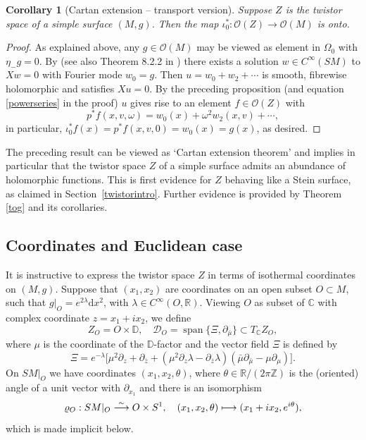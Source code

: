 \documentclass[JEP,XML,SOM,Unicode,published]{cedram}
\newcommand\mto{\mathchoice{\longmapsto}{\mapsto}{\mapsto}{\mapsto}}
\newcommand{\isom}{\stackrel{\sim}{\longrightarrow}}
\theoremstyle{plain}
\newtheorem{corollary}[theorem]{Corollary}
\theoremstyle{definition}
\newcommand{\Z}{\mathbb{Z}}
\newcommand{\R}{\mathbb{R}}
\newcommand{\C}{\mathbb{C}}
\newcommand{\DD}{\mathbb{D}}
\renewcommand{\O}{\mathcal{O}}
\newcommand{\D}{\mathscr{D}}
\renewcommand{\d}{\mathrm{d}}
\DeclareMathOperator{\spn}{span}
\newcommand{\1}{{\bf 1}}
\begin{document}
\begin{corollary}[Cartan extension -- transport version] \label{cartanex} Suppose $Z$ is the twistor space of a simple surface $(M,g)$. Then the map $\iota_0^*:\O(Z)\to \O(M)$ is onto.
\end{corollary}

\begin{proof} As explained above, any $g\in \O(M)$ may be viewed as element in $\Omega_0$ with $\eta_-g =0$. By \cite{PeUh05} (see also Theorem 8.2.2 in \cite{PSU20}) there exists a solution $w\in C^\infty(SM)$ to $Xw = 0$ with Fourier mode $w_0=g$. Then $u = w_0+w_2+\cdots$ is smooth, fibrewise holomorphic and satisfies $X u=0$. By the preceding proposition (and equation \eqref{powerseries} in the proof) $u$ gives rise to an element $f\in \O(Z)$ with
\begin{equation*}
p^*f(x,v,\omega)=w_0(x) + \omega^2 w_2(x,v) +\cdots,
\end{equation*}
in particular, $\iota_0^*f(x)=p^*f(x,v,0)=w_0(x)=g(x)$, as desired.
\end{proof}

The preceding result can be viewed as `Cartan extension theorem' and implies in particular that the twistor space $Z$ of a simple surface admits an abundance of holomorphic functions. This is first evidence for $Z$ behaving like a Stein surface, as claimed in Section~\ref{twistorintro}.
Further evidence is provided by Theorem \ref{tog} and its corollaries.

\subsection{Coordinates and Euclidean case} \label{coordinates} It is instructive to express the twis\-tor space $Z$ in terms of isothermal coordinates on $(M,g)$. Suppose that $(x_1,x_2)$ are coor\-dinates on an open subset $O\subset M$, such that $g\vert_O = e^{2\lambda}\d x^2$, with $\lambda\in C^\infty(O,\R)$. Viewing $O$ as subset of $\C$ with complex coordinate $z=x_1+ix_2$, we define
\begin{equation}\label{coo0}
Z_O= O\times \DD,\quad \D_O=\spn \{\Xi, \partial_{\bar \mu} \}\subset T_\C Z_O,
\end{equation}
where $\mu$ is the coordinate of the $\DD$-factor and the vector field $\Xi$ is defined by
\begin{equation*}
\Xi= e^{-\lambda} \bigl[\mu^2\partial_{z} + \partial_{\bar z} + \left(\mu^2 \partial_{z} \lambda - \partial_{\bar z} \lambda \right)(\bar \mu \partial_{\bar \mu} - \mu \partial_{\mu}) \bigr].
\end{equation*}
On $SM\vert_O$ we have coordinates $(x_1,x_2,\theta)$, where $\theta\in \R/(2\pi \Z)$ is the (oriented) angle of a unit vector with $\partial_{x_1}$ and there is an isomorphism
\begin{equation*}
\varrho_O: SM\vert_O \isom O \times S^1,\quad (x_1,x_2,\theta) \mto (x_1+ix_2,e^{i\theta}),
\end{equation*}
which is made implicit below.
\end{document}

